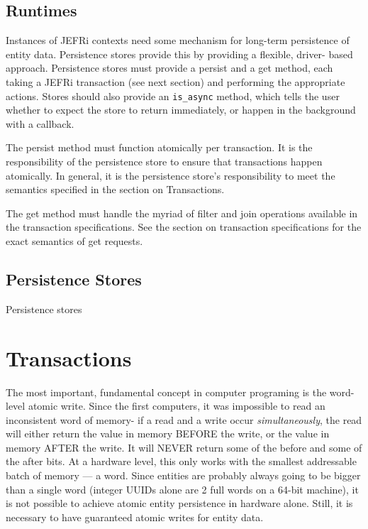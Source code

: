 \documentclass{article}
\newcommand{\ilcode}{\tt}
\begin{document}
\subsection{Runtimes}

Instances of JEFRi contexts need some mechanism for long-term persistence of
entity data. Persistence stores provide this by providing a flexible, driver-
based approach. Persistence stores must provide a persist and a get method, each
taking a JEFRi transaction (see next section) and performing the appropriate
actions. Stores should also provide an {\ilcode is\_async} method, which tells
the user whether to expect the store to return immediately, or happen in the
background with a callback.

The persist method must function atomically per transaction. It is the
responsibility of the persistence store to ensure that transactions happen
atomically. In general, it is the persistence store's responsibility to meet the
semantics specified in the section on Transactions.

The get method must handle the myriad of filter and join operations available in
the transaction specifications. See the section on transaction specifications
for the exact semantics of get requests.

\subsection{Persistence Stores}
Persistence stores

\section{Transactions}

The most important, fundamental concept in computer programing is the word-level
atomic write. Since the first computers, it was impossible to read an
inconsistent word of memory- if a read and a write occur {\sl simultaneously},
the read will either return the value in memory BEFORE the write, or the value
in memory AFTER the write. It will NEVER return some of the before and some of
the after bits. At a hardware level, this only works with the smallest
addressable batch of memory --- a word. Since entities are probably always going
to be bigger than a single word (integer UUIDs alone are 2 full words on a 64-bit
machine), it is not possible to achieve atomic entity persistence in hardware
alone. Still, it is necessary to have guaranteed atomic writes for entity data.
\end{document}
